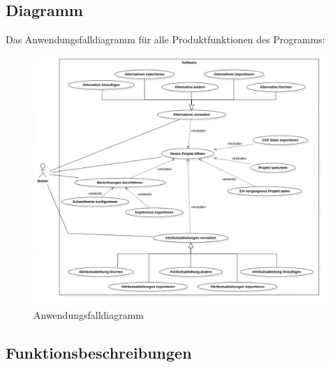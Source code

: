 \documentclass{article}
\begin{document}
\subsection{Diagramm}
Das Anwendungsfalldiagramm für alle Produktfunktionen des Programms:
\begin{figure}[H]%
  \centering
  \includegraphics[width=15cm]{specifications/img/use-case/UCD-finalNoWaterMark.jpg}
  \caption{Anwendungsfalldiagramm}
\end{figure} 
\newpage
{}

\subsection{Funktionsbeschreibungen}
\end{document}
